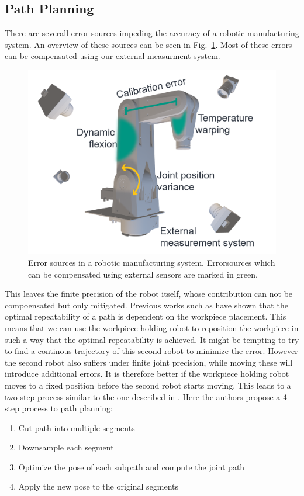 \documentclass[5p,times,procedia]{elsarticle}
\begin{document}
\subsection{Path Planning}
There are severall error sources impeding the accuracy of a robotic manufacturing system.
An overview of these sources can be seen in Fig.~\ref{fig:error_sources}.
Most of these errors can be compensated using our external measurment system.
\begin{figure}[h]
\centering
\includegraphics[width=\columnwidth]{graphics/error_sources.png}
\caption{Error sources in a robotic manufacturing system. Errorsources which can be compensated using external sensors are marked in green.}
\label{fig:error_sources}
\end{figure}
This leaves the finite precision of the robot itself, whose contribution can not be compoensated but only mitigated.
Previous works such as \cite{previous_work} have shown that the optimal repeatability of a path is dependent on the workpiece placement.
This means that we can use the workpiece holding robot to reposition the workpiece in such a way that the optimal repeatability is achieved.
It might be tempting to try to find a continous trajectory of this second robot to minimize the error.
However the second robot also suffers under finite joint precision, while moving these will introduce additional errors.
It is therefore better if the workpiece holding robot moves to a fixed position before the second robot starts moving.
This leads to a two step process similar to the one described in \cite{stroke_division}.
Here the authors propose a 4 step process to path planning:
\begin{enumerate}
  \item Cut path into multiple segments
  \item Downsample each segment
  \item Optimize the pose of each subpath and compute the joint path
  \item Apply the new pose to the original segments
\end{enumerate}
\end{document}
